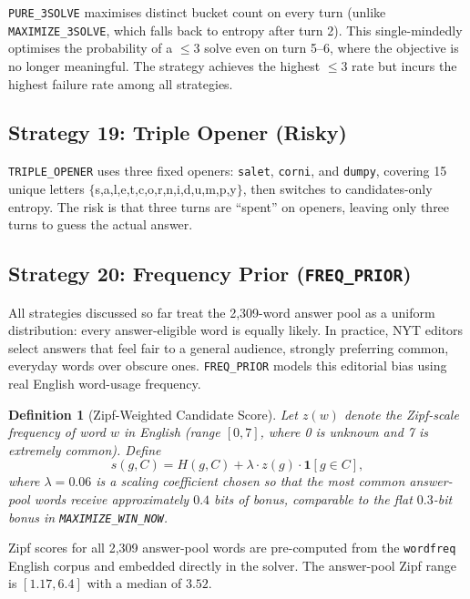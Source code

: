 \documentclass{article}
\newtheorem{definition}{Definition}
\begin{document}
\texttt{PURE\_3SOLVE} maximises distinct bucket count on every turn (unlike
\texttt{MAXIMIZE\_3SOLVE}, which falls back to entropy after turn 2). This
single-mindedly optimises the probability of a $\leq 3$ solve even on turn 5--6,
where the objective is no longer meaningful. The strategy achieves the highest
$\leq 3$ rate but incurs the highest failure rate among all strategies.

\subsection{Strategy 19: Triple Opener (Risky)}
\label{sec:strategy19}

\texttt{TRIPLE\_OPENER} uses three fixed openers: \texttt{salet}, \texttt{corni},
and \texttt{dumpy}, covering 15 unique letters $\{$s,a,l,e,t,c,o,r,n,i,d,u,m,p,y$\}$,
then switches to candidates-only entropy. The risk is that three turns are
``spent'' on openers, leaving only three turns to guess the actual answer.

\subsection{Strategy 20: Frequency Prior (\texttt{FREQ\_PRIOR})}
\label{sec:strategy20}

All strategies discussed so far treat the 2,309-word answer pool as a uniform
distribution: every answer-eligible word is equally likely. In practice, NYT
editors select answers that feel fair to a general audience, strongly preferring
common, everyday words over obscure ones. \texttt{FREQ\_PRIOR} models this
editorial bias using real English word-usage frequency.

\begin{definition}[Zipf-Weighted Candidate Score]
  Let $z(w)$ denote the Zipf-scale frequency of word $w$ in English (range
  $[0, 7]$, where 0 is unknown and 7 is extremely common). Define
  \[
    s(g, C) = H(g, C) + \lambda \cdot z(g) \cdot \mathbf{1}[g \in C],
  \]
  where $\lambda = 0.06$ is a scaling coefficient chosen so that the most
  common answer-pool words receive approximately $0.4$ bits of bonus, comparable
  to the flat $0.3$-bit bonus in \texttt{MAXIMIZE\_WIN\_NOW}.
\end{definition}

Zipf scores for all 2,309 answer-pool words are pre-computed from the
\texttt{wordfreq} English corpus \citep{speer2022wordfreq} and embedded
directly in the solver. The answer-pool Zipf range is $[1.17, 6.4]$ with
a median of $3.52$.
\end{document}
